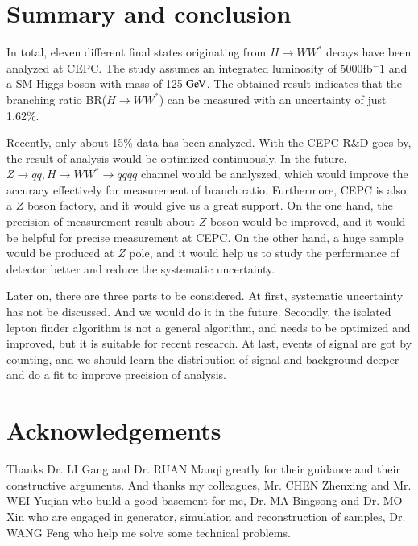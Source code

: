 \documentclass[11pt,a4paper]{cepcnote}
\begin{document}
%
%
\section{Summary and conclusion}
In total, eleven different final states originating from $H\rightarrow WW^*$ decays have been analyzed at CEPC. The study assumes an integrated luminosity of 5000fb$^-1$ and a SM Higgs boson with mass 
of 125$\gev$. The obtained result indicates that the branching ratio BR($H\rightarrow WW^*$) can be
measured with an uncertainty of just 1.62\%.

Recently, only about 15\% data has been analyzed. With the CEPC R\&D goes by, the result of analysis would be optimized continuously. 
In the future, $Z\rightarrow qq, H\rightarrow WW^*\rightarrow qqqq$ channel would be analyszed, which would improve the accuracy effectively 
for measurement of branch ratio. Furthermore, CEPC is also a $Z$ boson factory, and it would give us a great support. 
On the one hand, the precision of measurement result about $Z$ boson would be improved, and it would be helpful for precise 
measurement at CEPC. On the other hand, a huge sample would be produced at $Z$ pole, and it would help us to study the 
performance of detector better and reduce the systematic uncertainty.

Later on, there are three parts to be considered. At first, systematic uncertainty has not be discussed. 
And we would do it in the future. Secondly, the isolated lepton finder algorithm is not a general algorithm, and needs to be optimized and 
improved, but it is suitable for recent research. At last, events of signal are got by counting, and we should learn the distribution of 
signal and background deeper and do a fit to improve precision of analysis.
%

\section{Acknowledgements}

Thanks Dr. LI Gang and Dr. RUAN Manqi greatly for their guidance and their constructive arguments.
And thanks my colleagues, Mr. CHEN Zhenxing and Mr. WEI Yuqian who build a good basement for me, 
Dr. MA Bingsong and Dr. MO Xin who are engaged in generator, simulation and reconstruction of samples, 
Dr. WANG Feng who help me solve some technical problems.
\end{document}
